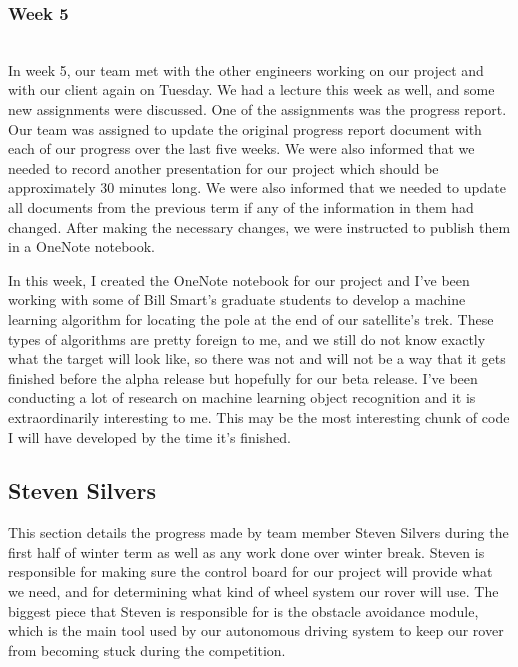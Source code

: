 \documentclass[10pt,letterpaper,onecolumn,draftclsnofoot,journal]{IEEEtran}
\begin{document}
\subsubsection{Week 5}\hspace*{\fill}\\
In week 5, our team met with the other engineers working on our project and with our client again on Tuesday. We had a lecture this week as well, and some new assignments were discussed. One of the assignments was the progress report. Our team was assigned to update the original progress report document with each of our progress over the last five weeks. We were also informed that we needed to record another presentation for our project which should be approximately 30 minutes long. We were also informed that we needed to update all documents from the previous term if any of the information in them had changed. After making the necessary changes, we were instructed to publish them in a OneNote notebook.\vspace{.3cm}
\par  
In this week, I created the OneNote notebook for our project and I've been working with some of Bill Smart's graduate students to develop a machine learning algorithm for locating the pole at the end of our satellite's trek. These types of algorithms are pretty foreign to me, and we still do not know exactly what the target will look like, so there was not and will not be a way that it gets finished before the alpha release but hopefully for our beta release. I've been conducting a lot of research on machine learning object recognition and it is extraordinarily interesting to me. This may be the most interesting chunk of code I will have developed by the time it's finished.\vspace{.3cm}

\subsection{Steven Silvers}
This section details the progress made by team member Steven Silvers during the first half of winter term  as well as any work done over winter break. Steven is responsible for making sure the control board for our project will provide what we need, and for determining what kind of wheel system our rover will use. The biggest piece that Steven is responsible for is the obstacle avoidance module, which is the main tool used by our autonomous driving system to keep our rover from becoming stuck during the competition.
\end{document}
